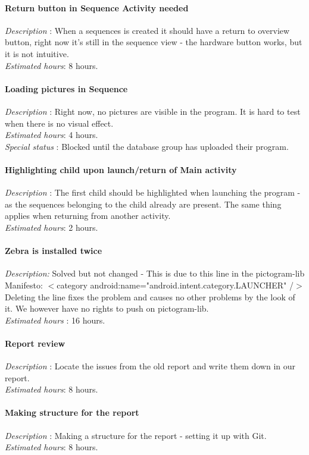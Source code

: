 \paragraph{Return button in Sequence Activity needed}
\emph{Description} : When a sequences is created it should have a return to overview button, right now it's still in the sequence view - the hardware button works, but it is not intuitive.\\
\emph{Estimated hours}: 8 hours.
\paragraph{Loading pictures in Sequence}
\emph{Description} : Right now, no pictures are visible in the program. It is hard to test when there is no visual effect.\\
\emph{Estimated hours}: 4 hours.\\
\emph{Special status} : Blocked until the database group has uploaded their program.
\paragraph{Highlighting child upon launch/return of Main activity}
\emph{Description} : The first child should be highlighted when launching the program - as the sequences belonging to the child already are present. The same thing applies when returning from another activity.\\
\emph{Estimated hours}: 2 hours.
\paragraph{Zebra is installed twice}
\emph{Description:} Solved but not changed - This is due to this line in the pictogram-lib Manifesto: 
$<$category android:name="android.intent.category.LAUNCHER" /$>$ 
Deleting the line fixes the problem and causes no other problems by the look of it. We however have no rights to push on pictogram-lib.\\
\emph{Estimated hours} : 16 hours.
\paragraph{Report review}
\emph{Description} : Locate the issues from the old report and write them down in our report.\\
\emph{Estimated hours}: 8 hours.
\paragraph{Making structure for the report}
\emph{Description} : Making a structure for the report - setting it up with Git.\\
\emph{Estimated hours}: 8 hours.
